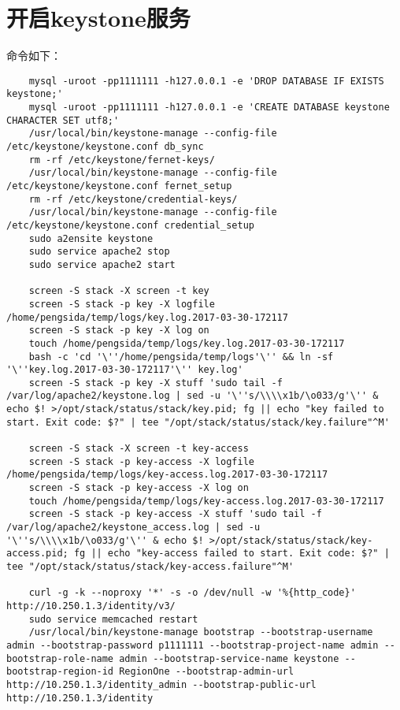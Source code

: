\documentclass[a4paper,left=1.5cm,right=1.5cm,11pt]{article}
\begin{document}
\section{开启keystone服务}
	命令如下：
	\begin{lstlisting}
	mysql -uroot -pp1111111 -h127.0.0.1 -e 'DROP DATABASE IF EXISTS keystone;'
	mysql -uroot -pp1111111 -h127.0.0.1 -e 'CREATE DATABASE keystone CHARACTER SET utf8;'
	/usr/local/bin/keystone-manage --config-file /etc/keystone/keystone.conf db_sync
	rm -rf /etc/keystone/fernet-keys/
	/usr/local/bin/keystone-manage --config-file /etc/keystone/keystone.conf fernet_setup
	rm -rf /etc/keystone/credential-keys/
	/usr/local/bin/keystone-manage --config-file /etc/keystone/keystone.conf credential_setup
	sudo a2ensite keystone
	sudo service apache2 stop
	sudo service apache2 start

	screen -S stack -X screen -t key
	screen -S stack -p key -X logfile /home/pengsida/temp/logs/key.log.2017-03-30-172117
	screen -S stack -p key -X log on
	touch /home/pengsida/temp/logs/key.log.2017-03-30-172117
	bash -c 'cd '\''/home/pengsida/temp/logs'\'' && ln -sf '\''key.log.2017-03-30-172117'\'' key.log'
	screen -S stack -p key -X stuff 'sudo tail -f /var/log/apache2/keystone.log | sed -u '\''s/\\\\x1b/\o033/g'\'' & echo $! >/opt/stack/status/stack/key.pid; fg || echo "key failed to start. Exit code: $?" | tee "/opt/stack/status/stack/key.failure"^M'

	screen -S stack -X screen -t key-access
	screen -S stack -p key-access -X logfile /home/pengsida/temp/logs/key-access.log.2017-03-30-172117
	screen -S stack -p key-access -X log on
	touch /home/pengsida/temp/logs/key-access.log.2017-03-30-172117
	screen -S stack -p key-access -X stuff 'sudo tail -f /var/log/apache2/keystone_access.log | sed -u '\''s/\\\\x1b/\o033/g'\'' & echo $! >/opt/stack/status/stack/key-access.pid; fg || echo "key-access failed to start. Exit code: $?" | tee "/opt/stack/status/stack/key-access.failure"^M'

	curl -g -k --noproxy '*' -s -o /dev/null -w '%{http_code}' http://10.250.1.3/identity/v3/
	sudo service memcached restart
	/usr/local/bin/keystone-manage bootstrap --bootstrap-username admin --bootstrap-password p1111111 --bootstrap-project-name admin --bootstrap-role-name admin --bootstrap-service-name keystone --bootstrap-region-id RegionOne --bootstrap-admin-url http://10.250.1.3/identity_admin --bootstrap-public-url http://10.250.1.3/identity
	\end{lstlisting}
\end{document}
